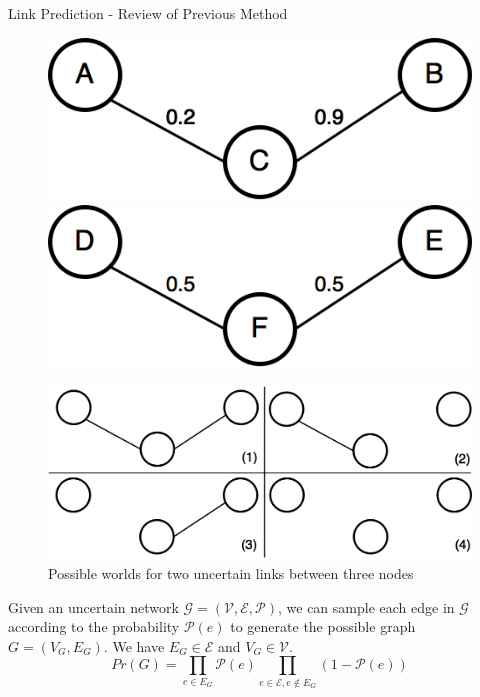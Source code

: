 \documentclass[9pt]{beamer}
\begin{document}
\begin{frame}{Link Prediction - Review of Previous Method}
\begin{figure}
\includegraphics[scale = 0.2]{common_neighbor_2.png}
\hspace{1cm}
\includegraphics[scale = 0.2]{common_neighbor_1.png}
\centering
\end{figure}

\begin{figure}
\includegraphics[scale = 0.18]{possible_world.png}
\centering
\caption{Possible worlds for two uncertain links between three nodes}
\label{example}
\end{figure}

Given an uncertain network $\mathcal{G = (V,E,P)}$, we can sample each edge in $\mathcal{G}$ according to the probability $\mathcal{P}(e)$ to generate the possible graph $G = (V_G,E_G)$. We have $E_G \in \mathcal{E}$ and $V_G \in \mathcal{V}$.
\begin{equation}
Pr(G) = \prod_{e\in E_G}\mathcal{P}(e)\prod_{e\in \mathcal{E}, e\notin E_G}(1-\mathcal{P}(e))
\end{equation}

\end{frame}
\end{document}
